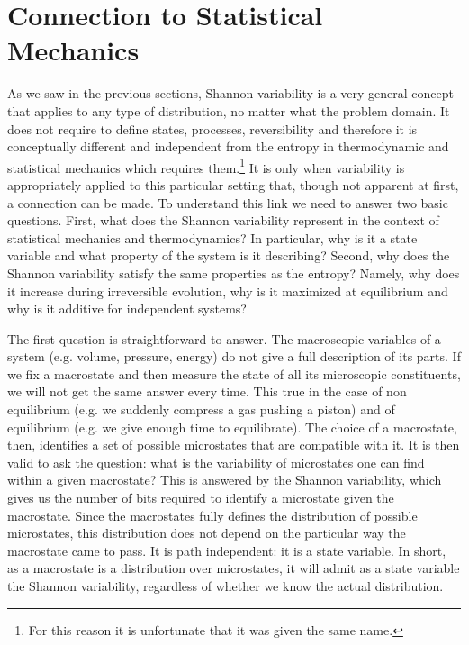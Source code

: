 \documentclass{article}
\begin{document}
\section{Connection to Statistical Mechanics\label{csm}}

As we saw in the previous sections, Shannon variability is a very general concept that applies to any type of distribution, no matter what the problem domain. It does not require to define states, processes, reversibility and therefore it is conceptually different and independent from the entropy in thermodynamic and statistical mechanics which requires them.\footnote{For this reason it is unfortunate that it was given the same name.} It is only when variability is appropriately applied to this particular setting that, though not apparent at first, a connection can be made. To understand this link we need to answer two basic questions. First, what does the Shannon variability represent in the context of statistical mechanics and thermodynamics? In particular, why is it a state variable and what property of the system is it describing? Second, why does the Shannon variability satisfy the same properties as the entropy? Namely, why does it increase during irreversible evolution, why is it maximized at equilibrium and why is it additive for independent systems?

The first question is straightforward to answer. The macroscopic variables of a system (e.g. volume, pressure, energy) do not give a full description of its parts. If we fix a macrostate and then measure the state of all its microscopic constituents, we will not get the same answer every time. This true in the case of non equilibrium (e.g. we suddenly compress a gas pushing a piston) and of equilibrium (e.g. we give enough time to equilibrate). The choice of a macrostate, then, identifies a set of possible microstates that are compatible with it. It is then valid to ask the question: what is the variability of microstates one can find within a given macrostate? This is answered by the Shannon variability, which gives us the number of bits required to identify a microstate given the macrostate. Since the macrostates fully defines the distribution of possible microstates, this distribution does not depend on the particular way the macrostate came to pass. It is path independent: it is a state variable. In short, as a macrostate is a distribution over microstates, it will admit as a state variable the Shannon variability, regardless of whether we know the actual distribution.
\end{document}
